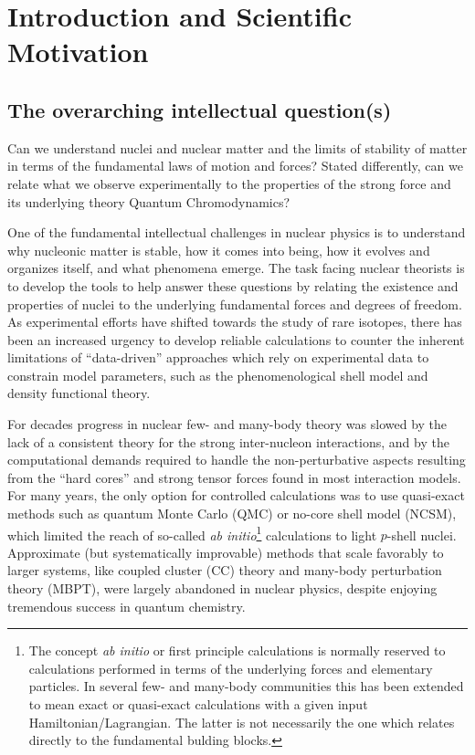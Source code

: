 \documentclass[10pt]{article}
\begin{document}
\section{Introduction and Scientific Motivation}

\subsection{The overarching intellectual question(s)}

Can we understand nuclei and nuclear matter and the limits of
stability of matter in terms of the fundamental laws of motion and
forces?  Stated differently, can we relate  what we observe experimentally
to the properties of the strong force and its underlying theory
Quantum Chromodynamics?

One of the fundamental intellectual challenges in nuclear physics is to understand
why nucleonic matter is stable, how it comes into being, how it
evolves and organizes itself, and what phenomena emerge. The task
facing nuclear theorists is to develop the tools to help answer these
questions by relating the existence and properties of nuclei to the
underlying fundamental forces and degrees of freedom. As experimental
efforts have shifted towards the study of rare
isotopes, there
has been an increased urgency to develop reliable 
calculations to counter the inherent limitations of ``data-driven''
approaches which rely on experimental data to constrain model
parameters, such as the phenomenological shell model and density
functional theory. 

For decades progress in nuclear few- and many-body theory was slowed
by the lack of a consistent theory for the strong inter-nucleon
interactions, and by the computational demands required to handle the
non-perturbative aspects resulting from the ``hard cores'' and strong
tensor forces found in most interaction models.  For many years, the
only option for controlled calculations was to use quasi-exact methods
such as quantum Monte Carlo (QMC) or no-core shell model (NCSM), which
limited the reach of so-called \emph{ab initio}\footnote{The concept
  \emph{ab initio} or first principle calculations is normally
  reserved to calculations performed in terms of the underlying forces
  and elementary particles. In several few- and many-body communities
  this has been extended to mean exact or quasi-exact calculations
  with a given input Hamiltonian/Lagrangian. The latter is not
  necessarily the one which relates directly to the fundamental
  bulding blocks.} calculations to light $p$-shell nuclei. Approximate
(but systematically improvable) methods that scale favorably to larger
systems, like coupled cluster (CC) theory and many-body perturbation
theory (MBPT), were largely abandoned in nuclear physics, despite
enjoying tremendous success in quantum chemistry.
\end{document}
